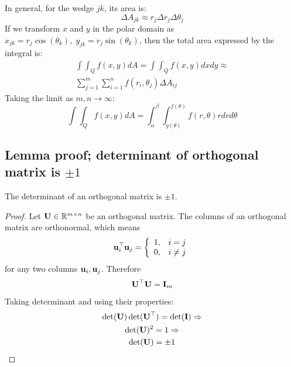 \documentclass[a4paper]{article}
\begin{document}
	In general, for the wedge $jk$, its area is:
	\[
		\Delta A_{jk} \approx r_j\Delta r_j \Delta \theta_j
	\]
	If we transform $x$ and $y$ in the polar domain as $x_{jk} = r_j\cos(\theta_k), \; y_{jk} = r_j\sin(\theta_k)$, then the total area expressed by the integral is:
	\begin{gather*}
		\int\int_Q f(x,y)dA =\int\int_Q f(x,y)dxdy  \approx \\
		\sum_{j=1}^{m}\sum_{i=1}^n f(r_i, \theta_j)\Delta A_{ij}
	\end{gather*}
	Taking the limit as $m,n \rightarrow \infty$:
	\[
		\int\int_Q f(x,y)dA = \int_\alpha^\beta\int_{g(\theta)}^{f(\theta)}f(r,\theta)rdrd\theta
	\]


\newpage
\subsection{Lemma proof; determinant of orthogonal matrix is $\pm 1$}
\label{app:det_of_ortho_mat}

\begin{lemma}
The determinant of an orthogonal matrix is $\pm 1$.
\end{lemma}
\begin{proof}
	
Let $\textbf{U} \in \mathbb{R}^{m\times n}$ be an orthogonal matrix. The columns of an orthogonal matrix are orthonormal, which means
\[
	\textbf{u}_i^{\top}\textbf{u}_j = 
		\left\{\begin{array}{lr}
			1, & i=j \\
			0, & i \neq j  
			\end{array}
		\right.
\]
for any two columns $\textbf{u}_i, \textbf{u}_j$. Therefore
\begin{gather*}
	\textbf{U}^{\top}\textbf{U} = \textbf{I}_m	
\end{gather*}
Taking determinant and using their properties:
\begin{gather*}
	\det(\textbf{U})\det(\textbf{U}^{\top}) = \det(\textbf{I}) \Rightarrow	\\
	\det(\textbf{U})^2 = 1 \Rightarrow \\
	\det(\textbf{U}) = \pm 1
\end{gather*}
\end{proof}
\newpage
\end{document}
